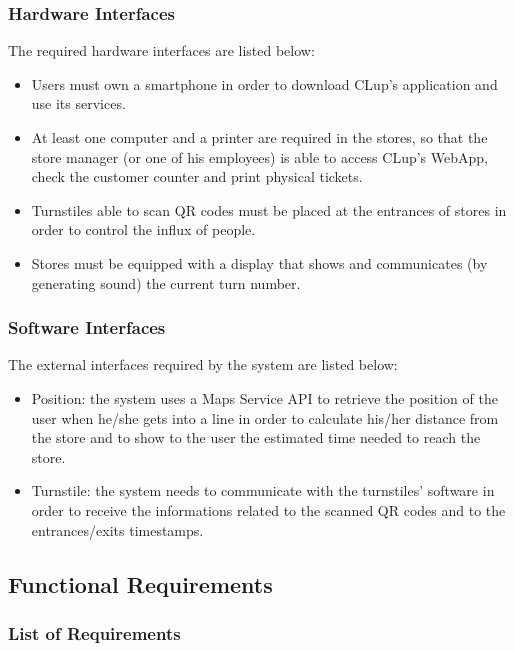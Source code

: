 \documentclass{article}
\begin{document}
\subsubsection{Hardware Interfaces}
The required hardware interfaces are listed below:
\begin{itemize}
\item Users must own a smartphone in order to download CLup’s application and use its services.
\item At least one computer and a printer are required in the stores, so that the store manager (or one of his employees) is able to access CLup’s WebApp, check the customer counter and print physical tickets.
\item Turnstiles able to scan QR codes must be placed at the entrances of stores in order to control the influx of people.
\item Stores must be equipped with a display that shows and communicates (by generating sound) the current turn number.
\end{itemize}
\subsubsection{Software Interfaces}
The external interfaces required by the system are listed below:
\begin{itemize}
\item Position: the system uses a Maps Service API to retrieve the position of the user when he/she gets into a line in order to calculate his/her distance from the store and to show to the user the estimated time needed to reach the store.
\item Turnstile: the system needs to communicate with the turnstiles' software in order to receive the informations related to the scanned QR codes and to the entrances/exits timestamps.
\end{itemize}
\subsection{Functional Requirements}
\subsubsection{List of Requirements}
\end{document}
